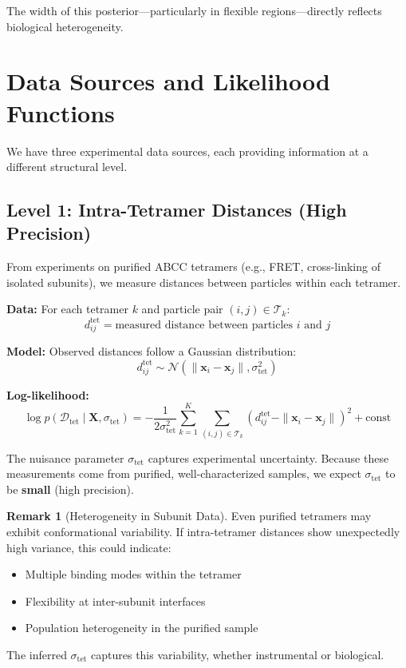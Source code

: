 \documentclass[11pt,a4paper]{article}
\newcommand{\bx}{\mathbf{x}}
\newcommand{\bX}{\mathbf{X}}
\newcommand{\Normal}{\mathcal{N}}
\theoremstyle{definition}
\newtheorem{remark}{Remark}
\begin{document}
The width of this posterior---particularly in flexible regions---directly reflects biological heterogeneity.

\section{Data Sources and Likelihood Functions}

We have three experimental data sources, each providing information at a different structural level.

\subsection{Level 1: Intra-Tetramer Distances (High Precision)}

From experiments on purified ABCC tetramers (e.g., FRET, cross-linking of isolated subunits), we measure distances between particles within each tetramer.

\textbf{Data:} For each tetramer $k$ and particle pair $(i,j) \in \mathcal{T}_k$:
\begin{equation}
    d_{ij}^{\text{tet}} = \text{measured distance between particles } i \text{ and } j
\end{equation}

\textbf{Model:} Observed distances follow a Gaussian distribution:
\begin{equation}
    d_{ij}^{\text{tet}} \sim \Normal\left( \|\bx_i - \bx_j\|, \sigma_{\text{tet}}^2 \right)
\end{equation}

\textbf{Log-likelihood:}
\begin{equation}
    \log p(\mathcal{D}_{\text{tet}} \mid \bX, \sigma_{\text{tet}}) = 
    -\frac{1}{2\sigma_{\text{tet}}^2} \sum_{k=1}^{K} \sum_{(i,j) \in \mathcal{T}_k} 
    \left( d_{ij}^{\text{tet}} - \|\bx_i - \bx_j\| \right)^2 + \text{const}
\end{equation}

The nuisance parameter $\sigma_{\text{tet}}$ captures experimental uncertainty. Because these measurements come from purified, well-characterized samples, we expect $\sigma_{\text{tet}}$ to be \textbf{small} (high precision).

\begin{remark}[Heterogeneity in Subunit Data]
Even purified tetramers may exhibit conformational variability. If intra-tetramer distances show unexpectedly high variance, this could indicate:
\begin{itemize}
    \item Multiple binding modes within the tetramer
    \item Flexibility at inter-subunit interfaces
    \item Population heterogeneity in the purified sample
\end{itemize}
The inferred $\sigma_{\text{tet}}$ captures this variability, whether instrumental or biological.
\end{remark}
\end{document}
